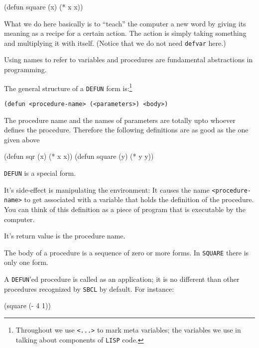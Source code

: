 \documentclass[a4paper,11pt]{article}
\begin{document}
\begin{uenum}
\begin{lispcode}
(defun square (x) (* x x))
\end{lispcode}

What we do here basically is to ``teach'' the computer a new word by giving its meaning as a recipe for a certain action. The action is simply taking something and multiplying it with itself. (Notice that we do not need \Verb+defvar+ here.) 

Using names to refer to variables and procedures are fundamental abstractions in programming.

\begin{uenumi}

\item The general structure of a \Verb+DEFUN+ form is:\footnote{Throughout we use \Verb+<...>+ to mark meta variables; the variables we use in talking about components of \Verb+LISP+ code.}

\Verb+(defun <procedure-name> (<parameters>) <body>)+

\item The procedure name and the names of parameters are totally upto whoever defines the procedure. Therefore the following definitions are as good as the one given above

\begin{lispcode}
(defun sqr (x) (* x x))
(defun square (y) (* y y))
\end{lispcode}

\item \Verb+DEFUN+ is a special form. 
\begin{uenumi}
\item It's side-effect is manipulating the environment: It causes the name \Verb+<procedure-name>+ to get associated with a variable that holds the definition of the procedure. You can think of this definition as a piece of program that is executable by the computer.
\item It's return value is the procedure name.
\end{uenumi}

\item The body of a procedure is a sequence of zero or more forms. In \Verb+SQUARE+ there is only one form.

\item A \Verb+DEFUN+'ed procedure is called as an application; it is no different than other procedures recognized by \Verb+SBCL+ by default. For instance:

\begin{lispcode}
(square (- 4 1))
\end{lispcode}


\end{uenumi}
\end{uenum}
\end{document}
